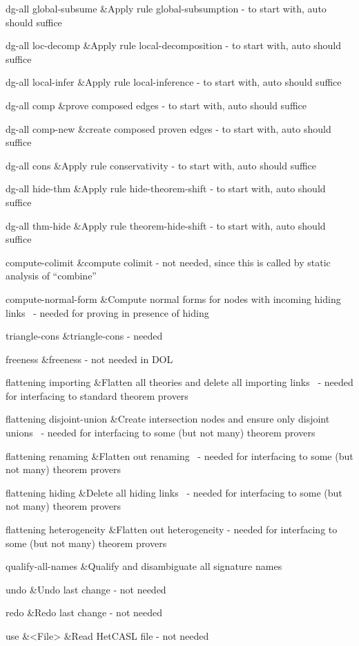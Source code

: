 \documentclass{article}
\begin{document}
dg-all global-subsume &Apply rule global-subsumption
- to start with, auto should suffice

dg-all loc-decomp &Apply rule
local-decomposition - to start with, auto should suffice

dg-all local-infer &Apply rule
local-inference - to start with, auto should suffice

dg-all comp &prove
composed edges - to start with, auto should suffice

dg-all comp-new &create composed
proven edges - to start with, auto should suffice

dg-all cons
&Apply rule
conservativity - to start with, auto should suffice

dg-all hide-thm &Apply rule
hide-theorem-shift - to start with, auto should suffice

dg-all thm-hide &Apply rule
theorem-hide-shift - to start with, auto should suffice

compute-colimit &compute colimit -
not needed, since this is called by static analysis of “combine”

compute-normal-form &Compute normal forms for nodes
with incoming hiding links \ {}- needed for proving in presence of
hiding

triangle-cons
&triangle-cons -
needed

freeness
&freeness
- not needed in DOL

flattening importing &Flatten all theories
and delete all importing links \ {}- needed for interfacing to standard
theorem provers

flattening disjoint-union &Create intersection nodes and
ensure only disjoint unions \ {}- needed for interfacing to some (but
not many) theorem provers

flattening renaming &Flatten out renaming
\ {}- needed for interfacing to some (but not many) theorem provers

flattening hiding &Delete all
hiding links \ {}- needed for interfacing to some (but not many)
theorem provers

flattening heterogeneity &Flatten out heterogeneity -
needed for interfacing to some (but not many) theorem provers

qualify-all-names &Qualify and
disambiguate all signature names

undo
&Undo
last change - not needed

redo
&Redo
last change - not needed

use
&{\textless}File{\textgreater}
&Read HetCASL file - not needed
\end{document}
